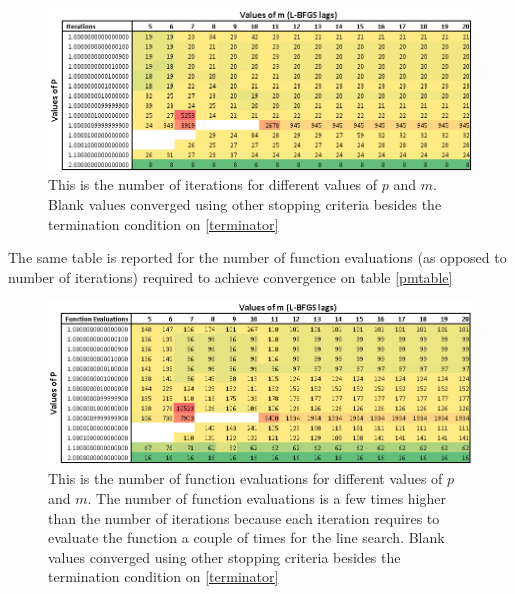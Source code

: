 \begin{figure}
\begin{center}
\includegraphics[scale=0.55]{Figures/Niterations.PNG}
\caption[Number of function iterations for different values of $p$ and $m$ in the solution of Modified Rosenbrock]{This is the number of iterations for different values of $p$ and $m$. Blank values converged using other stopping criteria besides the termination condition on \eqref{terminator}}
\label{pmtableiter}
\end{center}
\end{figure}

The same table is reported for the number of function evaluations (as opposed to number of iterations) required to achieve convergence on table \eqref{pmtable}

\begin{figure}
\begin{center}
\includegraphics[scale=0.55]{Figures/Nevaluations.PNG}
\caption[Number of function evaluations for different values of $p$ and $m$ in the solution of Modified Rosenbrock]{This is the number of function evaluations for different values of $p$ and $m$. The number of function evaluations is a few times higher than the number of iterations because each iteration requires to evaluate the function a couple of times for the line search. Blank values converged using other stopping criteria besides the termination condition on \eqref{terminator}}
\label{pmtable}
\end{center}
\end{figure}

